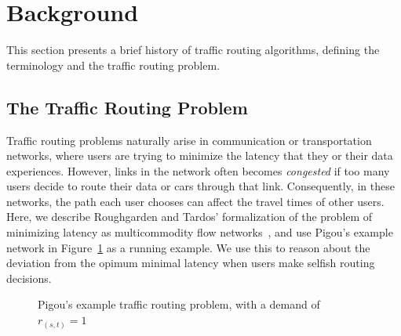\section{Background}
This section presents a brief history of traffic routing algorithms, defining the terminology
and the traffic routing problem.

\subsection{The Traffic Routing Problem}
Traffic routing problems naturally arise in communication or transportation networks, where users are trying to minimize the latency that they or their data experiences.
However, links in the network often becomes \emph{congested} if too many users decide to route their data 
or cars through that link. Consequently, in these networks, the path each user chooses can affect the travel times of other
users. Here, we describe Roughgarden and Tardos' formalization of the problem of minimizing latency as multicommodity flow networks~\cite{tardos,roughgarden}, and use Pigou's example network in Figure~\ref{fig:Pigou} as a running example. We use this to reason about the deviation from the opimum minimal latency when users make selfish routing decisions.

\begin{figure}[ht!]
\begin{center}
\end{center}
    \caption{Pigou's example traffic routing problem, with a demand of $r_{(s,t)} = 1$}
\label{fig:Pigou}
\end{figure}

